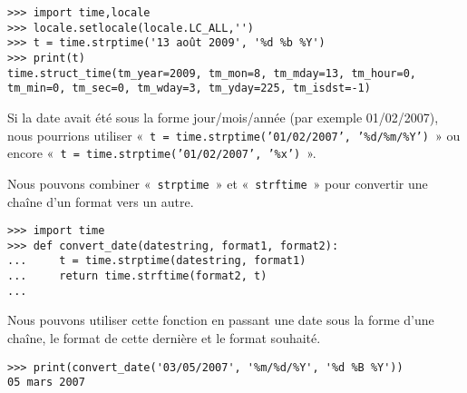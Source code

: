 \begin{Verbatim}[frame=single,rulecolor=\color{gray}]
>>> import time,locale
>>> locale.setlocale(locale.LC_ALL,'')
>>> t = time.strptime('13 août 2009', '%d %b %Y')
>>> print(t)
time.struct_time(tm_year=2009, tm_mon=8, tm_mday=13, tm_hour=0, 
tm_min=0, tm_sec=0, tm_wday=3, tm_yday=225, tm_isdst=-1)
\end{Verbatim}

Si la date avait été sous la forme jour/mois/année (par exemple 01/02/2007), nous pourrions utiliser « \texttt{t = time.strptime('01/02/2007', '\%d/\%m/\%Y')} » ou encore « \texttt{t = time.strptime('01/02/2007', '\%x')} ».


Nous pouvons combiner « \texttt{strptime} » et « \texttt{strftime} » pour convertir une chaîne d'un format vers un autre.

\begin{Verbatim}[frame=single,rulecolor=\color{gray}]
>>> import time
>>> def convert_date(datestring, format1, format2):
...     t = time.strptime(datestring, format1)
...     return time.strftime(format2, t)
...
\end{Verbatim}

Nous pouvons utiliser cette fonction en passant une date sous la forme d'une chaîne, le format de cette dernière et le format souhaité.


\begin{Verbatim}[frame=single,rulecolor=\color{gray}]
>>> print(convert_date('03/05/2007', '%m/%d/%Y', '%d %B %Y'))
05 mars 2007
\end{Verbatim}
